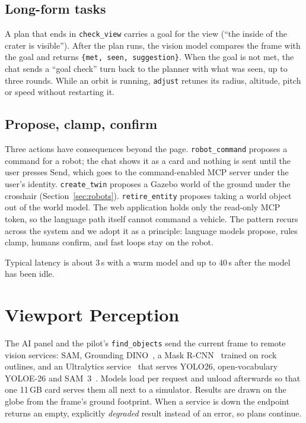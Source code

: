 \documentclass[journal]{IEEEtran}
\newcommand{\code}[1]{\texttt{#1}}
\begin{document}
\subsection{Long-form tasks}
A plan that ends in \code{check\_view} carries a goal for the view (``the inside of the crater is
visible''). After the plan runs, the vision model compares the frame with the goal and returns
\code{\{met, seen, suggestion\}}. When the goal is not met, the chat sends a ``goal check'' turn
back to the planner with what was seen, up to three rounds. While an orbit is running,
\code{adjust} retunes its radius, altitude, pitch or speed without restarting it.

\subsection{Propose, clamp, confirm}
Three actions have consequences beyond the page. \code{robot\_command} proposes a command for a
robot; the chat shows it as a card and nothing is sent until the user presses Send, which goes to
the command-enabled MCP server under the user's identity. \code{create\_twin} proposes a Gazebo
world of the ground under the crosshair (Section~\ref{sec:robots}). \code{retire\_entity}
proposes taking a world object out of the world model. The web application holds only the
read-only MCP token, so the language path itself cannot command a vehicle. The pattern
recurs across the system and we adopt it as a principle: language models propose, rules clamp,
humans confirm, and fast loops stay on the robot.

Typical latency is about 3\,s with a warm model and up to 40\,s after the model has been idle.

\section{Viewport Perception}
\label{sec:perception}

The AI panel and the pilot's \code{find\_objects} send the current frame to remote vision services:
SAM, Grounding DINO~\cite{liu2024gdino}, a Mask R-CNN~\cite{he2017maskrcnn} trained on rock
outlines, and an Ultralytics service~\cite{ultralytics} that serves YOLO26, open-vocabulary
YOLOE-26 and SAM~3~\cite{carion2025sam3}. Models load per request and unload afterwards so that
one 11\,GB card serves them all next to a simulator. Results are drawn on the globe from the frame's
ground footprint. When a service is down the endpoint returns an empty, explicitly
\emph{degraded} result instead of an error, so plans continue.
\end{document}
